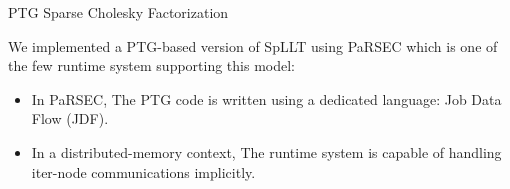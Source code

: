 \documentclass[unknownkeysallowed]{beamer}
\begin{document}
\begin{frame}{PTG Sparse Cholesky Factorization}
  
  We implemented a \alert{PTG}-based version of SpLLT using
  \alert{PaRSEC} which is one of the few runtime system supporting
  this model:

  \vspace{0.5cm}

  \begin{itemize}
    \item In PaRSEC, The PTG code is written using a dedicated
      language: \alert{Job Data Flow} (JDF).

      \vspace{0.5cm}
      
    \item In a \alert{distributed-memory context}, The runtime system
      is capable of handling iter-node communications implicitly.
  \end{itemize}
    
\end{frame}
\end{document}
